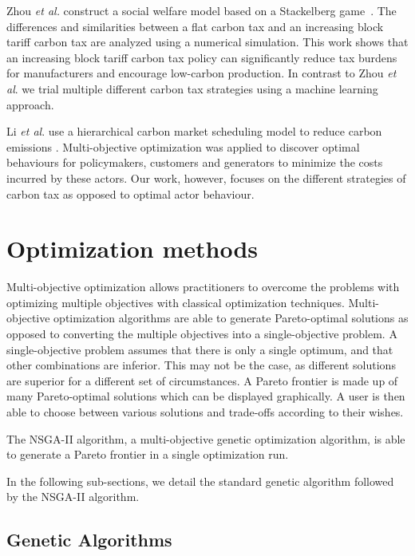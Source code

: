 Zhou \textit{et al.} construct a social welfare model based on a Stackelberg game~\cite{Zhou2019}. The differences and similarities between a flat carbon tax and an increasing block tariff carbon tax are analyzed using a numerical simulation. This work shows that an increasing block tariff carbon tax policy can significantly reduce tax burdens for manufacturers and encourage low-carbon production. In contrast to Zhou \textit{et al}. we trial multiple different carbon tax strategies using a machine learning approach. 

Li \textit{et al}. use a hierarchical carbon market scheduling model to reduce carbon emissions \cite{Li2017}. Multi-objective optimization was applied to discover optimal behaviours for policymakers, customers and generators to minimize the costs incurred by these actors. Our work, however, focuses on the different strategies of carbon tax as opposed to optimal actor behaviour.



\section{Optimization methods}
\label{sec:optimization_methods}

Multi-objective optimization allows practitioners to overcome the problems with optimizing multiple objectives with classical optimization techniques. Multi-objective optimization algorithms are able to generate Pareto-optimal solutions as opposed to converting the multiple objectives into a single-objective problem. A single-objective problem assumes that there is only a single optimum, and that other combinations are inferior. This may not be the case, as different solutions are superior for a different set of circumstances. A Pareto frontier is made up of many Pareto-optimal solutions which can be displayed graphically. A user is then able to choose between various solutions and trade-offs according to their wishes.

The NSGA-II algorithm, a multi-objective genetic optimization algorithm, is able to generate a Pareto frontier in a single optimization run. 

In the following sub-sections, we detail the standard genetic algorithm followed by the NSGA-II algorithm.

\subsection{Genetic Algorithms}

